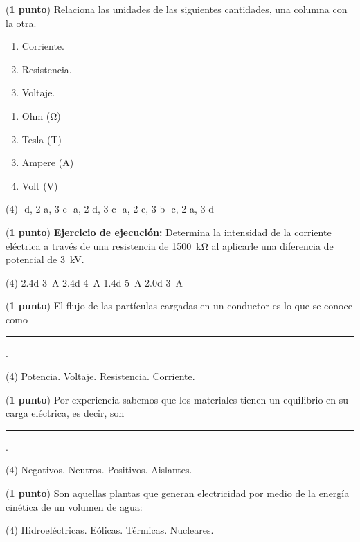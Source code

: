 \documentclass[12pt, letter]{exam}
\begin{document}
\begin{questions}
    \question (\textbf{1 punto}) Relaciona las unidades de las siguientes cantidades, una columna con la otra.
    \\
    \begin{minipage}[t]{0.4\linewidth}
        \begin{enumerate}[label=\arabic*)]
            \item Corriente.
            \item Resistencia.
            \item Voltaje.
        \end{enumerate}
    \end{minipage}
    \begin{minipage}[t]{0.4\linewidth}
        \begin{enumerate}[label=\alph*)]
            \item Ohm (\si{\ohm})
            \item Tesla (T)
            \item Ampere (\si{\ampere})
            \item Volt (\si{\volt})
        \end{enumerate}
    \end{minipage}
    \begin{tasks}(4)
        -d, 2-a, 3-c
        -a, 2-d, 3-c
        -a, 2-c, 3-b
        -c, 2-a, 3-d
    \end{tasks}
    \question (\textbf{1 punto}) \label{Problema_02} \textbf{Ejercicio de ejecución: } Determina la intensidad de la corriente eléctrica a través de una resistencia de \SI{1500}{\kilo\ohm} al aplicarle una diferencia de potencial de \SI{3}{\kilo\volt}.
    \begin{tasks}(4)
        \task \SI{2.4d-3}{\ampere}
        \task \SI{2.4d-4}{\ampere}
        \task \SI{1.4d-5}{\ampere}
        \task \SI{2.0d-3}{\ampere}
    \end{tasks}
    \question (\textbf{1 punto}) El flujo de las partículas cargadas en un conductor es lo que se conoce como \rule{2cm}{0.1mm}.
    \begin{tasks}(4)
        \task Potencia.
        \task Voltaje.
        \task Resistencia.
        \task Corriente.
    \end{tasks}
    \question (\textbf{1 punto}) Por experiencia sabemos que los materiales tienen un equilibrio en su carga eléctrica, es decir, son \rule{2cm}{0.1mm}.
    \begin{tasks}(4)
        \task Negativos.
        \task Neutros.
        \task Positivos.
        \task Aislantes.
    \end{tasks}
    \question (\textbf{1 punto}) Son aquellas plantas que generan electricidad por medio de la energía cinética de un volumen de agua:
    \begin{tasks}(4)
        \task Hidroeléctricas.
        \task Eólicas.
        \task Térmicas.
        \task Nucleares.
    \end{tasks}


\end{questions}
\end{document}
